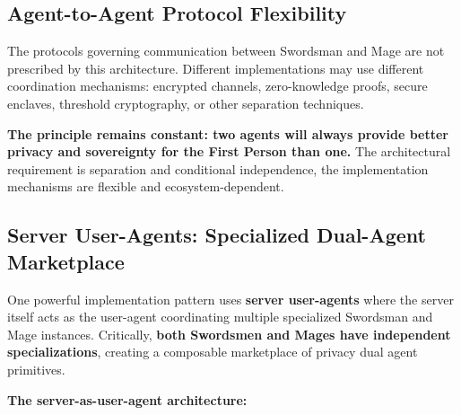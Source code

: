\documentclass[
]{article}
\begin{document}
\subsection{Agent-to-Agent Protocol
Flexibility}\label{agent-to-agent-protocol-flexibility}

The protocols governing communication between Swordsman and Mage are not
prescribed by this architecture. Different implementations may use
different coordination mechanisms: encrypted channels, zero-knowledge
proofs, secure enclaves, threshold cryptography, or other separation
techniques.

\textbf{The principle remains constant: two agents will always provide
better privacy and sovereignty for the First Person than one.} The
architectural requirement is separation and conditional independence,
the implementation mechanisms are flexible and ecosystem-dependent.

\subsection{Server User-Agents: Specialized Dual-Agent
Marketplace}\label{server-user-agents-specialized-dual-agent-marketplace}

One powerful implementation pattern uses \textbf{server user-agents}
where the server itself acts as the user-agent coordinating multiple
specialized Swordsman and Mage instances. Critically, \textbf{both
Swordsmen and Mages have independent specializations}, creating a
composable marketplace of privacy dual agent primitives.

\textbf{The server-as-user-agent architecture:}
\end{document}
